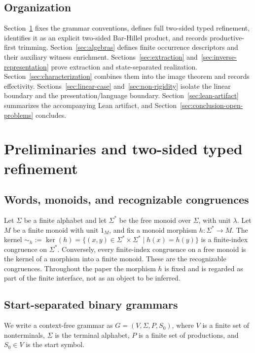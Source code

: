 \documentclass[sub]{jalc}
\newcommand{\eM}{1_M}
\begin{document}
\subsection{Organization}
\label{subsec:organization}

Section~\ref{sec:prelim} fixes the grammar conventions, defines full two-sided
typed refinement, identifies it as an explicit two-sided Bar-Hillel product, and
records productive-first trimming.  Section~\ref{sec:algebras} defines finite
occurrence descriptors and their auxiliary witness enrichment.  Sections~\ref{sec:extraction}
and~\ref{sec:inverse-representation} prove extraction and state-separated
realization.  Section~\ref{sec:characterization} combines them into the image
theorem and records effectivity.  Sections~\ref{sec:linear-case} and~\ref{sec:non-rigidity}
isolate the linear boundary and the presentation/language boundary.
Section~\ref{sec:lean-artifact} summarizes the accompanying Lean artifact, and
Section~\ref{sec:conclusion-open-problems} concludes.


\section{Preliminaries and two-sided typed refinement}
\label{sec:prelim}

\subsection{Words, monoids, and recognizable congruences}

Let \(\Sigma\) be a finite alphabet and let \(\Sigma^*\) be the free monoid over \(\Sigma\), with unit \(\lambda\). Let \(M\) be a finite monoid with unit \(\eM\), and fix a monoid morphism \(h:\Sigma^*\to M\). The kernel \(\sim_h:=\ker(h)=\{(x,y)\in\Sigma^*\times\Sigma^*\mid h(x)=h(y)\}\) is a finite-index congruence on \(\Sigma^*\). Conversely, every finite-index congruence on a free monoid is the kernel of a morphism into a finite monoid. These are the recognizable congruences. Throughout the paper the morphism \(h\) is fixed and is regarded as part of the finite interface, not as an object to be inferred.

\subsection{Start-separated binary grammars}

We write a context-free grammar as \(G=(V,\Sigma,P,S_0)\), where \(V\) is a finite set of nonterminals, \(\Sigma\) is the terminal alphabet, \(P\) is a finite set of productions, and \(S_0\in V\) is the start symbol.
\end{document}
